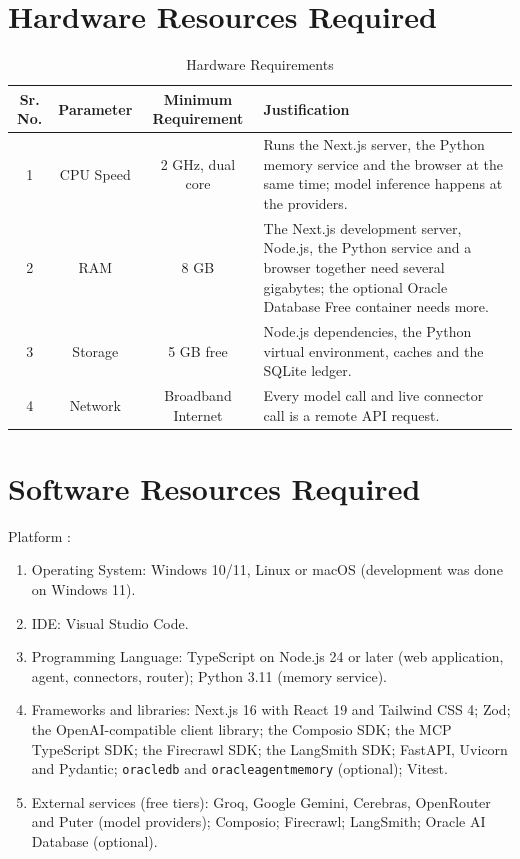 \section{Hardware Resources Required}
\begin{table}[!htbp]
\begin{center}
\def\arraystretch{1.5}
  \begin{tabular}{| c | c | c | p{6cm} |}
\hline
Sr. No. &	Parameter &	Minimum Requirement & Justification \\
\hline
1 &	CPU Speed &	 2 GHz, dual core  & Runs the Next.js server, the Python memory service and the browser at the same time; model inference happens at the providers. \\
\hline
2 &	RAM  &	8 GB &  The Next.js development server, Node.js, the Python service and a browser together need several gigabytes; the optional Oracle Database Free container needs more. \\
 \hline
3 & Storage & 5 GB free & Node.js dependencies, the Python virtual environment, caches and the SQLite ledger. \\
\hline
4 & Network & Broadband Internet & Every model call and live connector call is a remote API request. \\
\hline
\end{tabular}
 \caption { Hardware Requirements }
 \label{tab:hreq}
\end{center}

\end{table}


\section{Software Resources Required}
Platform :
\begin{enumerate}
\item Operating System: Windows 10/11, Linux or macOS (development was done on Windows 11).
\item IDE: Visual Studio Code.
\item Programming Language: TypeScript on Node.js 24 or later (web application, agent, connectors, router); Python 3.11 (memory service).
\item Frameworks and libraries: Next.js 16 with React 19 and Tailwind CSS 4; Zod; the OpenAI-compatible client library; the Composio SDK; the MCP TypeScript SDK; the Firecrawl SDK; the LangSmith SDK; FastAPI, Uvicorn and Pydantic; \texttt{oracledb} and \texttt{oracleagentmemory} (optional); Vitest.
\item External services (free tiers): Groq, Google Gemini, Cerebras, OpenRouter and Puter (model providers); Composio; Firecrawl; LangSmith; Oracle AI Database (optional).
\end{enumerate}




